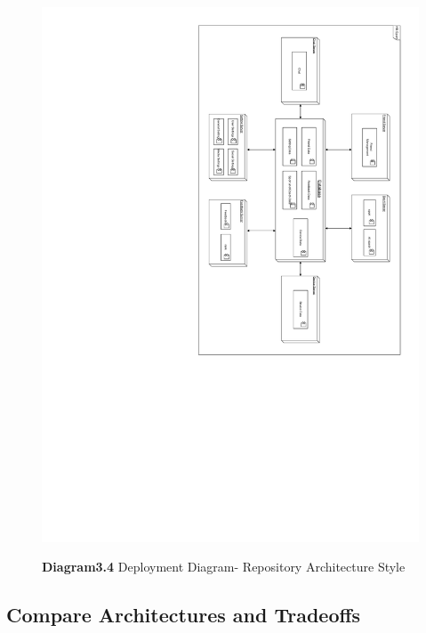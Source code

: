 \documentclass[a4paper]{article}
\begin{document}
	\begin{figure}[H]
		\centering
		\caption*{\textbf{Diagram3.4} Deployment Diagram- Repository Architecture Style}
		\includegraphics[width=1\textwidth]{images/DeploymentDiagram_Repository.pdf}
		\label{DD_RA}
	\end{figure}
	\newpage

	\subsection{Compare Architectures and Tradeoffs}
\end{document}
